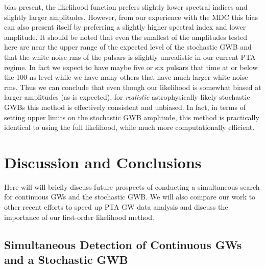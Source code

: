 \documentclass[iop]{emulateapj} \usepackage{apjfonts}
\begin{document}
bias present, the likelihood function prefers slightly lower spectral
indices and slightly larger amplitudes. However, from our experience
with the MDC this bias can also present itself by preferring a
slightly higher spectral index and lower amplitude. It should be noted
that even the smallest of the amplitudes tested here are near the
upper range of the expected level of the stochastic GWB \citep{s13}
and that the white noise rms of the pulsars is slightly unrealistic in
our current PTA regime. In fact we expect to have maybe five or six
pulsars that time at or below the 100 ns level while we have many
others that have much larger white noise rms. Thus we can conclude
that even though our likelihood is somewhat biased at larger
amplitudes (as is expected), for \emph{realistic} astrophysically
likely stochastic GWBs this method is effectively consistent and
unbiased. In fact, in terms of setting upper limits on the stochastic
GWB amplitude, this method is practically identical to using
the full likelihood, while much more computationally efficient.


\section{Discussion and Conclusions} \label{sec:conclusions} Here will
will briefly discuss future prospects of conducting a simultaneous
search for continuous GWs and the stochastic GWB. We will also compare
our work to other recent efforts to speed up PTA GW data analysis and
discuss the importance of our first-order likelihood method.

\subsection{Simultaneous Detection of Continuous GWs and a Stochastic
GWB}
\end{document}

